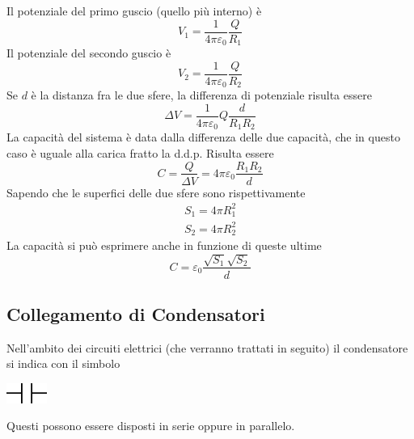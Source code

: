 \documentclass[10pt, letterpaper]{report}
\begin{document}
Il potenziale del primo guscio (quello più interno) è $$ V_1=\frac{1}{4\pi\varepsilon_0}\frac{Q}{R_1}$$
Il potenziale del secondo guscio è 
 $$ V_2=\frac{1}{4\pi\varepsilon_0}\frac{Q}{R_2}$$
 Se $d$ è la distanza fra le due sfere, la differenza di potenziale risulta essere 
 $$ \Delta V =\frac{1}{4\pi\varepsilon_0}Q\frac{d}{R_1R_2} $$
La capacità del sistema è data dalla differenza delle due capacità, che in questo caso è uguale alla carica fratto la d.d.p. Risulta essere 
$$ C=\frac{Q}{\Delta V}={4\pi\varepsilon_0}\frac{R_1R_2}{d}$$
Sapendo che le superfici delle due sfere sono rispettivamente $$\begin{matrix}
    S_1=4\pi R_1^2\\ 
    S_2=4\pi R_2^2
\end{matrix} $$
La capacità si può esprimere anche in funzione di queste ultime 
$$C=\varepsilon_0\frac{\sqrt{S_1}\sqrt{S_2}}{d} $$
\subsection{Collegamento di Condensatori}
Nell'ambito dei circuiti elettrici (che verranno trattati in seguito) il condensatore si indica con il simbolo \begin{center}
    \includegraphics[width=0.1\textwidth]{images/simboloCondensatore.eps}
\end{center} 
Questi possono essere disposti in serie oppure in parallelo.
\end{document}
